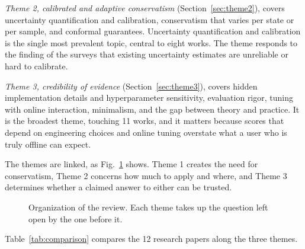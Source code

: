 \documentclass[journal]{IEEEtran}
\begin{document}
\emph{Theme 2, calibrated and adaptive conservatism} (Section~\ref{sec:theme2}), covers uncertainty quantification and calibration, conservatism that varies per state or per sample, and conformal guarantees. Uncertainty quantification and calibration is the single most prevalent topic, central to eight works. The theme responds to the finding of the surveys that existing uncertainty estimates are unreliable or hard to calibrate.

\emph{Theme 3, credibility of evidence} (Section~\ref{sec:theme3}), covers hidden implementation details and hyperparameter sensitivity, evaluation rigor, tuning with online interaction, minimalism, and the gap between theory and practice. It is the broadest theme, touching 11 works, and it matters because scores that depend on engineering choices and online tuning overstate what a user who is truly offline can expect.

The themes are linked, as Fig.~\ref{fig:themes} shows. Theme 1 creates the need for conservatism, Theme 2 concerns how much to apply and where, and Theme 3 determines whether a claimed answer to either can be trusted.

\begin{figure}[!t]
\centering
{}
\caption{Organization of the review. Each theme takes up the question left open by the one before it.}
\label{fig:themes}
\end{figure} Table~\ref{tab:comparison} compares the 12 research papers along the three themes.
\end{document}
